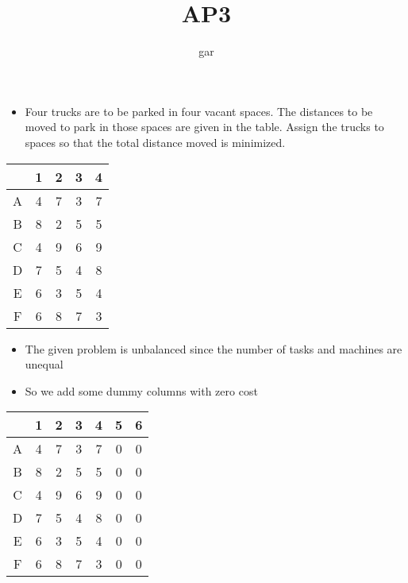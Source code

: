 \documentclass[12pt]{beamer}
\title{AP3}
\author{gar}
\date{}
\begin{document}
\maketitle

\begin{frame}
\begin{itemize}
\item Four trucks are to be parked in four vacant spaces. The distances to be moved to park in those spaces are given in the table. 
Assign the trucks to spaces so that the total distance moved is minimized.
\end{itemize}
\begin{center}
\begin{tabular}{|c|cccc|}
\hline
  & 1  & 2  & 3  & 4 \\
\hline
A & 4 & 7 & 3 & 7\\
B & 8 & 2 & 5 & 5\\
C & 4 & 9 & 6 & 9\\
D & 7 & 5 & 4 & 8\\
E & 6 & 3 & 5 & 4\\
F & 6 & 8 & 7 & 3\\
\hline
\end{tabular}
\end{center}
\end{frame}

\begin{frame}
\begin{itemize}
\item The given problem is unbalanced since the number of tasks and machines are unequal
\item So we add some dummy columns with zero cost
\end{itemize}
\begin{center}
\begin{tabular}{|c|cccccc|}
\hline
  & 1 & 2 & 3 & 4 & 5 & 6 \\
\hline
A & 4 & 7 & 3 & 7 & 0 & 0 \\
B & 8 & 2 & 5 & 5 & 0 & 0 \\
C & 4 & 9 & 6 & 9 & 0 & 0 \\
D & 7 & 5 & 4 & 8 & 0 & 0 \\
E & 6 & 3 & 5 & 4 & 0 & 0 \\
F & 6 & 8 & 7 & 3 & 0 & 0 \\
\hline
\end{tabular}
\end{center}
\end{frame}
\end{document}
